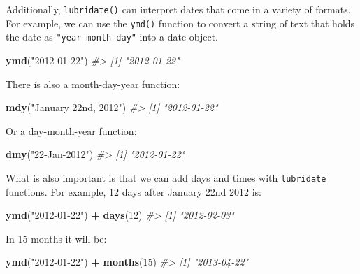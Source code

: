 \documentclass[
]{book}
\newenvironment{Shaded}{\begin{snugshade}}{\end{snugshade}}
\newcommand{\CommentTok}[1]{\textcolor[rgb]{0.56,0.35,0.01}{\textit{#1}}}
\newcommand{\DecValTok}[1]{\textcolor[rgb]{0.00,0.00,0.81}{#1}}
\newcommand{\FunctionTok}[1]{\textcolor[rgb]{0.13,0.29,0.53}{\textbf{#1}}}
\newcommand{\NormalTok}[1]{#1}
\newcommand{\SpecialCharTok}[1]{\textcolor[rgb]{0.81,0.36,0.00}{\textbf{#1}}}
\newcommand{\StringTok}[1]{\textcolor[rgb]{0.31,0.60,0.02}{#1}}
\begin{document}
Additionally, \texttt{lubridate()} can interpret dates that come in a variety of formats. For example, we can use the \texttt{ymd()} function to convert a string of text that holds the date as \texttt{"year-month-day"} into a date object.

\begin{Shaded}
\begin{Highlighting}[]
\FunctionTok{ymd}\NormalTok{(}\StringTok{"2012{-}01{-}22"}\NormalTok{)}
\CommentTok{\#\textgreater{} [1] "2012{-}01{-}22"}
\end{Highlighting}
\end{Shaded}

There is also a month-day-year function:

\begin{Shaded}
\begin{Highlighting}[]
\FunctionTok{mdy}\NormalTok{(}\StringTok{"January 22nd, 2012"}\NormalTok{)}
\CommentTok{\#\textgreater{} [1] "2012{-}01{-}22"}
\end{Highlighting}
\end{Shaded}

Or a day-month-year function:

\begin{Shaded}
\begin{Highlighting}[]
\FunctionTok{dmy}\NormalTok{(}\StringTok{"22{-}Jan{-}2012"}\NormalTok{)}
\CommentTok{\#\textgreater{} [1] "2012{-}01{-}22"}
\end{Highlighting}
\end{Shaded}

What is also important is that we can add days and times with \texttt{lubridate} functions. For example, 12 days after January 22nd 2012 is:

\begin{Shaded}
\begin{Highlighting}[]
\FunctionTok{ymd}\NormalTok{(}\StringTok{"2012{-}01{-}22"}\NormalTok{) }\SpecialCharTok{+} \FunctionTok{days}\NormalTok{(}\DecValTok{12}\NormalTok{)}
\CommentTok{\#\textgreater{} [1] "2012{-}02{-}03"}
\end{Highlighting}
\end{Shaded}

In 15 months it will be:

\begin{Shaded}
\begin{Highlighting}[]
\FunctionTok{ymd}\NormalTok{(}\StringTok{"2012{-}01{-}22"}\NormalTok{) }\SpecialCharTok{+} \FunctionTok{months}\NormalTok{(}\DecValTok{15}\NormalTok{)}
\CommentTok{\#\textgreater{} [1] "2013{-}04{-}22"}
\end{Highlighting}
\end{Shaded}
\end{document}
